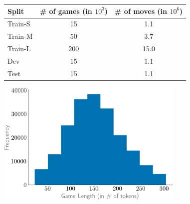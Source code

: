 


\begin{figure}
\begin{minipage}{\textwidth}
	\begin{minipage}[b]{0.5\textwidth}
		\setlength\tabcolsep{4pt}
		\begin{tabular}{lcc}
			\toprule
			Split & \# of games (in $10^3$) & \# of moves (in $10^6$)\\ %
			\midrule
			Train-S & 	\phantom{1}15 	& \phantom{1}1.1\\ %
			Train-M & 	\phantom{1}50 	& \phantom{1}3.7\\ %
			Train-L & 	200 			& 15.0\\ 			 %
			Dev 	& 	\phantom{1}15 	& \phantom{1}1.1\\ %
			Test 	& 	\phantom{1}15 	& \phantom{1}1.1\\ %
			\bottomrule
		\end{tabular}
		\label{tab:data_stats}
	\end{minipage}
	\hfill
	\begin{minipage}[b]{0.48\textwidth}
		\centering
		\includegraphics[width=0.8\textwidth]{figures/hist_game}
		\vspace{-0.1in}
		\label{fig:hist_len}
	\end{minipage}
\end{minipage}
\end{figure}


